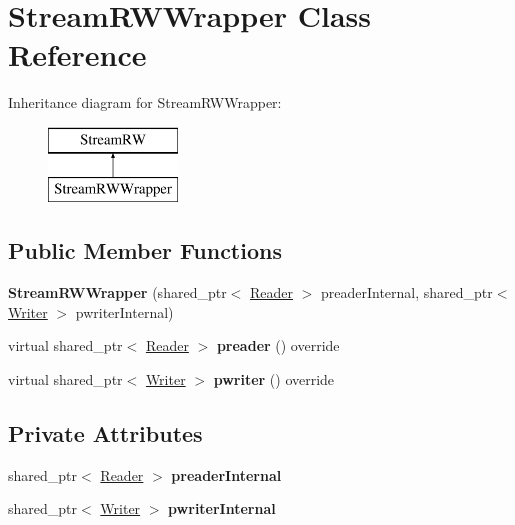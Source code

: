\hypertarget{classStreamRWWrapper}{\section{Stream\+R\+W\+Wrapper Class Reference}
\label{classStreamRWWrapper}
}
Inheritance diagram for Stream\+R\+W\+Wrapper\+:\begin{figure}[H]
\begin{center}
\leavevmode
\includegraphics[height=2.000000cm]{classStreamRWWrapper}
\end{center}
\end{figure}
\subsection*{Public Member Functions}
\begin{DoxyCompactItemize}
\item 
\hypertarget{classStreamRWWrapper_a21cd77c17b4433f487d194faab09a01a}{{\bfseries Stream\+R\+W\+Wrapper} (shared\+\_\+ptr$<$ \hyperlink{classReader}{Reader} $>$ preader\+Internal, shared\+\_\+ptr$<$ \hyperlink{classWriter}{Writer} $>$ pwriter\+Internal)}\label{classStreamRWWrapper_a21cd77c17b4433f487d194faab09a01a}

\item 
\hypertarget{classStreamRWWrapper_acd59f895c6c1b593b91fa3baa4d5f336}{virtual shared\+\_\+ptr$<$ \hyperlink{classReader}{Reader} $>$ {\bfseries preader} () override}\label{classStreamRWWrapper_acd59f895c6c1b593b91fa3baa4d5f336}

\item 
\hypertarget{classStreamRWWrapper_a1845cb431add4731e535976c8632b65a}{virtual shared\+\_\+ptr$<$ \hyperlink{classWriter}{Writer} $>$ {\bfseries pwriter} () override}\label{classStreamRWWrapper_a1845cb431add4731e535976c8632b65a}

\end{DoxyCompactItemize}
\subsection*{Private Attributes}
\begin{DoxyCompactItemize}
\item 
\hypertarget{classStreamRWWrapper_aa76b1760c08637be7c1d9aa3f84782b4}{shared\+\_\+ptr$<$ \hyperlink{classReader}{Reader} $>$ {\bfseries preader\+Internal}}\label{classStreamRWWrapper_aa76b1760c08637be7c1d9aa3f84782b4}

\item 
\hypertarget{classStreamRWWrapper_a04d85d5cf7dbaf6adad1783ab7ef7c6c}{shared\+\_\+ptr$<$ \hyperlink{classWriter}{Writer} $>$ {\bfseries pwriter\+Internal}}\label{classStreamRWWrapper_a04d85d5cf7dbaf6adad1783ab7ef7c6c}

\end{DoxyCompactItemize}



